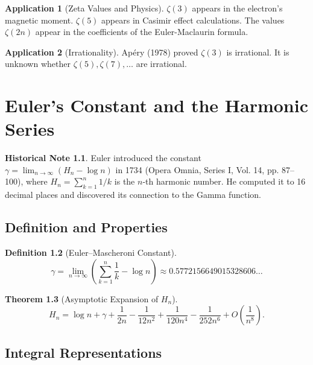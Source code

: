 \documentclass[11pt,a4paper,twoside]{book}
\theoremstyle{eulerstyle}
\newtheorem{theorem}{Theorem}[chapter]
\theoremstyle{definition}
\newtheorem{definition}[theorem]{Definition}
\newtheorem{historical}[theorem]{Historical Note}
\newtheorem{application}[theorem]{Application}
\begin{document}
\begin{application}[Zeta Values and Physics]
$\zeta(3)$ appears in the electron's magnetic moment. $\zeta(5)$ appears in Casimir effect calculations. The values $\zeta(2n)$ appear in the coefficients of the Euler-Maclaurin formula.
\end{application}

\begin{application}[Irrationality]
Apéry (1978) proved $\zeta(3)$ is irrational. It is unknown whether $\zeta(5), \zeta(7), \dots$ are irrational.
\end{application}

\cleardoublepage

\chapter{Euler's Constant and the Harmonic Series}
\label{ch:harmonic}

\begin{historical}
Euler introduced the constant $\gamma = \lim_{n \to \infty} (H_n - \log n)$ in 1734 (Opera Omnia, Series I, Vol. 14, pp. 87--100), where $H_n = \sum_{k=1}^n 1/k$ is the $n$-th harmonic number. He computed it to 16 decimal places and discovered its connection to the Gamma function.
\end{historical}

\section{Definition and Properties}

\begin{definition}[Euler--Mascheroni Constant]
\[
\gamma = \lim_{n \to \infty} \left( \sum_{k=1}^n \frac{1}{k} - \log n \right) \approx 0.5772156649015328606\dots
\]
\end{definition}

\begin{theorem}[Asymptotic Expansion of $H_n$]
\[
H_n = \log n + \gamma + \frac{1}{2n} - \frac{1}{12n^2} + \frac{1}{120n^4} - \frac{1}{252n^6} + O\left(\frac{1}{n^8}\right).
\]
\end{theorem}

\section{Integral Representations}
\end{document}
